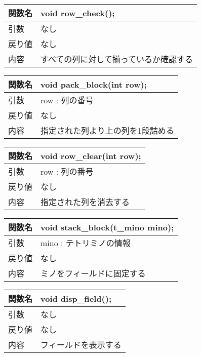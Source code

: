 \begin{table}[htb]
\begin{tabular}{|l|l|}
\hline
関数名 & void row\_check();  \\ \hline
引数  & なし                  \\ \hline
戻り値 & なし                  \\ \hline
内容  & すべての列に対して揃っているか確認する \\ \hline
\end{tabular}
\end{table}

\begin{table}[htb]
\begin{tabular}{|l|l|}
\hline
関数名 & void pack\_block(int row); \\ \hline
引数  & row : 列の番号                 \\ \hline
戻り値 & なし                         \\ \hline
内容  & 指定された列より上の列を1段詰める          \\ \hline
\end{tabular}
\end{table}

\begin{table}[htb]
\begin{tabular}{|l|l|}
\hline
関数名 & void row\_clear(int row); \\ \hline
引数  & row : 列の番号                \\ \hline
戻り値 & なし                        \\ \hline
内容  & 指定された列を消去する               \\ \hline
\end{tabular}
\end{table}

\begin{table}[htb]
\begin{tabular}{|l|l|}
\hline
関数名 & void stack\_block(t\_mino mino); \\ \hline
引数  & mino : テトリミノの情報                  \\ \hline
戻り値 & なし                               \\ \hline
内容  & ミノをフィールドに固定する                    \\ \hline
\end{tabular}
\end{table}

\begin{table}[htb]
\begin{tabular}{|l|l|}
\hline
関数名 & void disp\_field(); \\ \hline
引数  & なし                  \\ \hline
戻り値 & なし                  \\ \hline
内容  & フィールドを表示する          \\ \hline
\end{tabular}
\end{table}

